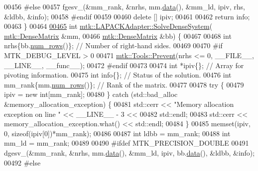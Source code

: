 \begin{DoxyCode}
00456 \textcolor{preprocessor}{  #else}
00457   fgesv\_(&mm\_rank, &nrhs, mm.\hyperlink{classmtk_1_1DenseMatrix_a0c33b8a9e01d157c61ddbdf807c25d84}{data}(), &mm\_ld, ipiv, rhs, &ldbb, &info);
00458 \textcolor{preprocessor}{  #endif}
00459 
00460   \textcolor{keyword}{delete} [] ipiv;
00461 
00462   \textcolor{keywordflow}{return} info;
00463 \}
00464 
\hypertarget{mtk__lapack__adapter_8cc_source_l00465}{}\hyperlink{classmtk_1_1LAPACKAdapter_af0723bba1d73450119d093b9cf1ff6f0}{00465} \textcolor{keywordtype}{int} \hyperlink{classmtk_1_1LAPACKAdapter_a7428bccf74fd4a4af68fb7233846da22}{mtk::LAPACKAdapter::SolveDenseSystem}(
      \hyperlink{classmtk_1_1DenseMatrix}{mtk::DenseMatrix} &mm,
00466                                          \hyperlink{classmtk_1_1DenseMatrix}{mtk::DenseMatrix} &bb) \{
00467 
00468   \textcolor{keywordtype}{int} nrhs\{bb.\hyperlink{classmtk_1_1DenseMatrix_a53f3afb3b6a8d21854458aaa9663cc74}{num\_rows}()\};  \textcolor{comment}{// Number of right-hand sides.}
00469 
00470 \textcolor{preprocessor}{  #if MTK\_DEBUG\_LEVEL > 0}
00471   \hyperlink{classmtk_1_1Tools_a332324c6f25e66be9dff48c5987a3b9f}{mtk::Tools::Prevent}(nrhs <= 0, \_\_FILE\_\_, \_\_LINE\_\_, \_\_func\_\_);
00472 \textcolor{preprocessor}{  #endif}
00473 
00474   \textcolor{keywordtype}{int} *ipiv\{\};                \textcolor{comment}{// Array for pivoting information.}
00475   \textcolor{keywordtype}{int} info\{\};                 \textcolor{comment}{// Status of the solution.}
00476   \textcolor{keywordtype}{int} mm\_rank\{mm.\hyperlink{classmtk_1_1DenseMatrix_a53f3afb3b6a8d21854458aaa9663cc74}{num\_rows}()\}; \textcolor{comment}{// Rank of the matrix.}
00477 
00478   \textcolor{keywordflow}{try} \{
00479     ipiv = \textcolor{keyword}{new} \textcolor{keywordtype}{int}[mm\_rank];
00480   \} \textcolor{keywordflow}{catch} (std::bad\_alloc &memory\_allocation\_exception) \{
00481     std::cerr << \textcolor{stringliteral}{"Memory allocation exception on line "} << \_\_LINE\_\_ - 3 <<
00482       std::endl;
00483     std::cerr << memory\_allocation\_exception.what() << std::endl;
00484   \}
00485   memset(ipiv, 0, \textcolor{keyword}{sizeof}(ipiv[0])*mm\_rank);
00486 
00487   \textcolor{keywordtype}{int} ldbb = mm\_rank;
00488   \textcolor{keywordtype}{int} mm\_ld = mm\_rank;
00489 
00490 \textcolor{preprocessor}{  #ifdef MTK\_PRECISION\_DOUBLE}
00491   dgesv\_(&mm\_rank, &nrhs, mm.\hyperlink{classmtk_1_1DenseMatrix_a0c33b8a9e01d157c61ddbdf807c25d84}{data}(), &mm\_ld, ipiv, bb.\hyperlink{classmtk_1_1DenseMatrix_a0c33b8a9e01d157c61ddbdf807c25d84}{data}(), &ldbb, &info);
00492 \textcolor{preprocessor}{  #else}

\end{DoxyCode}
